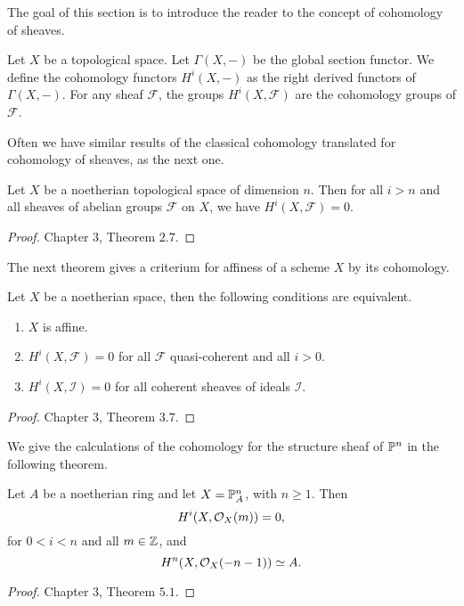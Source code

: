 \documentclass[
	oldfontcommands,
	sumario=abnt-6027-2012,
	12pt,			%
	openright,		%
	oneside,		%
	a4paper,		%
	english,		%
	brazil			%
	]{imecc-unicamp}
\begin{document}
The goal of this section is to introduce the reader to the concept of cohomology of sheaves. 

\begin{definition}
	Let $X$ be a topological space. Let $\Gamma(X,-)$ be the global section functor. We define the cohomology functors $H^i(X,-)$ as the right derived functors of $\Gamma(X,-)$. For any sheaf $\mathcal F$, the groups $H^i(X,\mathcal F)$ are the cohomology groups of $\mathcal F$.
\end{definition}

Often we have similar results of the classical cohomology translated for cohomology of sheaves, as the next one.

\begin{teorema}
	Let $X$ be a noetherian topological space of dimension $n$. Then for all $i>n$ and all sheaves of abelian groups $\mathcal F$ on $X$, we have $H^i(X,\mathcal F)=0$.
\end{teorema} 
\begin{proof}
	\cite{hartshorne1977algebraic} Chapter $3$, Theorem $2.7$.
\end{proof}

The next theorem gives a criterium for affiness of a scheme $X$ by its cohomology. 

\begin{teorema}
	Let $X$ be a noetherian space, then the following conditions are equivalent. 
	\begin{enumerate}
		\item $X$ is affine.
		\item $H^i(X,\mathcal F)=0$ for all $\mathcal F$ quasi-coherent and all $i>0$.
		\item $H^i(X,\mathcal I)=0$ for all coherent sheaves of ideals $\mathcal I$. 
	\end{enumerate}
\end{teorema}
\begin{proof}
	\cite{hartshorne1977algebraic} Chapter $3$, Theorem $3.7$.
\end{proof}

We give the calculations of the cohomology for the structure sheaf of ${\mathbb P}^n$ in the following theorem.

\begin{teorema}
	Let $A$ be a noetherian ring and let $X={\mathbb P}^n_A$, with $n\geq1$. Then $$H^i(X, {\mathcal O}_X(m))=0,$$ for $0<i<n$ and all $m\in {\mathbb Z}$, and $$H^n(X,{\mathcal O}_X(-n-1))\simeq A.$$
\end{teorema}
\begin{proof}
	\cite{hartshorne1977algebraic} Chapter $3$, Theorem $5.1$.
\end{proof}
\end{document}
